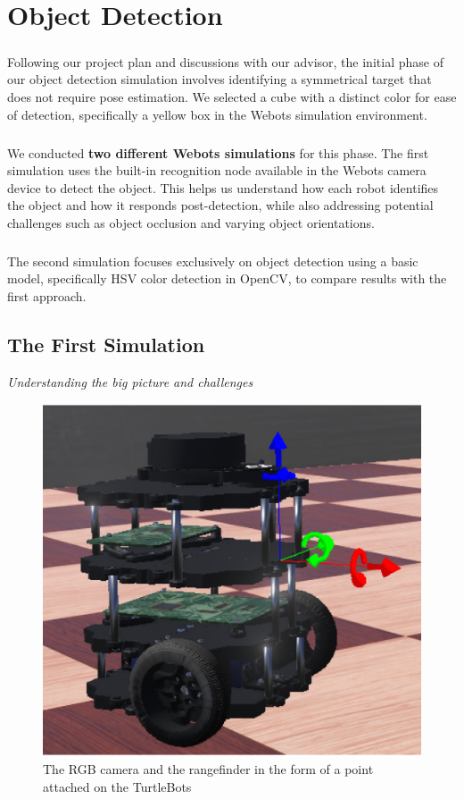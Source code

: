 \chapter{Object Detection}

\paragraph*{}
Following our project plan and discussions with our advisor, the initial phase of our object detection simulation involves identifying a symmetrical target that does not require pose estimation. We selected a cube with a distinct color for ease of detection, specifically a yellow box in the Webots simulation environment.

\paragraph*{}
We conducted \textbf{two different Webots simulations} for this phase. The first simulation uses the built-in recognition node available in the Webots camera device to detect the object. This helps us understand how each robot identifies the object and how it responds post-detection, while also addressing potential challenges such as object occlusion and varying object orientations. 

\paragraph*{}
The second simulation focuses exclusively on object detection using a basic model, specifically HSV color detection in OpenCV, to compare results with the first approach.

\section {The First Simulation}
\textit {Understanding the big picture and challenges}

\begin{figure}[H]
    \centering
    \includegraphics[width=0.6\linewidth]{assets/images/object_detection/Figure1.png}
    \caption{The RGB camera and the rangefinder in the form of a point attached on the TurtleBots}
    \label{fig:object detection figure 1.} 
\end{figure}

